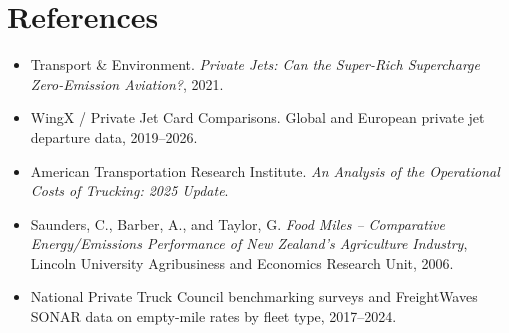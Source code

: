 \documentclass[11pt]{article}
\begin{document}
\section*{References}
\begin{itemize}[nosep]
\item Transport \& Environment. \emph{Private Jets: Can the Super-Rich Supercharge Zero-Emission Aviation?}, 2021.
\item WingX / Private Jet Card Comparisons. Global and European private jet departure data, 2019--2026.
\item American Transportation Research Institute. \emph{An Analysis of the Operational Costs of Trucking: 2025 Update}.
\item Saunders, C., Barber, A., and Taylor, G. \emph{Food Miles -- Comparative Energy/Emissions Performance of New Zealand's Agriculture Industry}, Lincoln University Agribusiness and Economics Research Unit, 2006.
\item National Private Truck Council benchmarking surveys and FreightWaves SONAR data on empty-mile rates by fleet type, 2017--2024.
\end{itemize}
\end{document}
